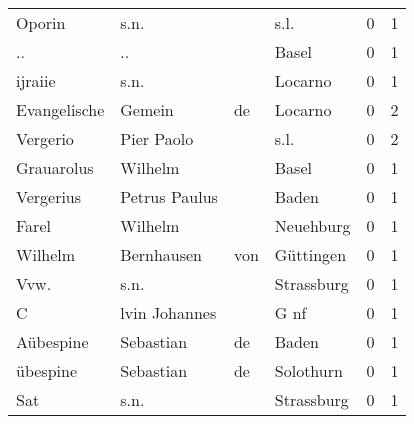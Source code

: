 \begin{tabular}{llllrr}
                   Oporin &                               s.n. &             &                                        s.l. &          0 &         1 \\
                       .. &                                 .. &             &                                       Basel &          0 &         1 \\
                  ijraiie &                               s.n. &             &                                     Locarno &          0 &         1 \\
             Evangelische &                             Gemein &          de &                                     Locarno &          0 &         2 \\
                 Vergerio &                         Pier Paolo &             &                                        s.l. &          0 &         2 \\
               Grauarolus &                            Wilhelm &             &                                       Basel &          0 &         1 \\
                Vergerius &                      Petrus Paulus &             &                                       Baden &          0 &         1 \\
                    Farel &                            Wilhelm &             &                                   Neuehburg &          0 &         1 \\
                  Wilhelm &                         Bernhausen &         von &                                   Güttingen &          0 &         1 \\
                     Vvw. &                               s.n. &             &                                  Strassburg &          0 &         1 \\
                        C &                      lvin Johannes &             &                                        G nf &          0 &         1 \\
                Aübespine &                          Sebastian &          de &                                       Baden &          0 &         1 \\
                 übespine &                          Sebastian &          de &                                   Solothurn &          0 &         1 \\
                      Sat &                               s.n. &             &                                  Strassburg &          0 &         1 \\

\end{tabular}
